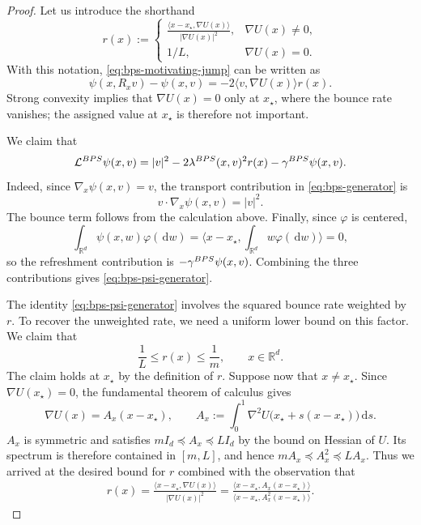 \documentclass[10pt,a4paper]{amsart}
\newcommand{\R}{\RR}
\newcommand{\RR}{\mathbb{R}}
\newcommand{\abs}[1]{\lvert#1\rvert}
\newcommand{\bps}{{\rm BPS}}
\newcommand{\dd}{\ud}
\newcommand{\ip}[2]{\langle #1,#2\rangle}
\newcommand{\ud}{\,\mathrm{d}}
\begin{document}
\begin{proof}
Let us introduce the shorthand
\[
        r(x):=
        \begin{cases}
        \displaystyle
        \frac{\ip{x-x_\star}{\nabla U(x)}}{\abs{\nabla U(x)}^2},
                &\nabla U(x)\ne0,\\[2mm]
        1/L,    &\nabla U(x)=0.
        \end{cases}
\]
With this notation, \eqref{eq:bps-motivating-jump} can be written as
\[
        \psi(x,R_xv)-\psi(x,v)
        =-2\ip{v}{\nabla U(x)}r(x).
\]
Strong convexity implies that $\nabla U(x)=0$ only at $x_\star$, where the
bounce rate vanishes; the assigned value at $x_\star$ is therefore not important.  

We claim that
\begin{equation}\label{eq:bps-psi-generator}
        \mathcal L^{\bps}\psi(x,v)
        =\abs v^2-2\lambda^{\bps}(x,v)^2r(x)
          -\gamma^{\bps}\psi(x,v).
\end{equation}
Indeed, since $\nabla_x\psi(x,v)=v$, the transport contribution in
\eqref{eq:bps-generator} is
\[
        v\cdot\nabla_x\psi(x,v)=\abs v^2.
\]
The bounce term follows from the calculation above. Finally, since $\varphi$ is centered,
\[
        \int_{\R^d}\psi(x,w)\varphi(\dd w)
        =\ip{x-x_\star}{\int_{\R^d}w\varphi(\dd w)}
        =0,
\]
so the refreshment contribution is
$-\gamma^{\bps}\psi(x,v)$.  Combining the three contributions gives
\eqref{eq:bps-psi-generator}.

The identity \eqref{eq:bps-psi-generator} involves
the squared bounce rate weighted by $r$.  To recover the unweighted rate, we
need a uniform lower bound on this factor.  We claim that
\[
        \frac1L\le r(x)\le\frac1m,
        \qquad x\in\R^d.
\]
The claim holds at $x_\star$ by the definition of $r$.  Suppose now that
$x\ne x_\star$.  Since $\nabla U(x_\star)=0$, the fundamental theorem of
calculus gives
\[
        \nabla U(x)=A_x(x-x_\star),
        \qquad
        A_x:=\int_0^1
        \nabla^2U\bigl(x_\star+s(x-x_\star)\bigr)\dd s.
\]
$A_x$ is symmetric and satisfies
$mI_d\preceq A_x\preceq L I_d$ by the bound on Hessian of $U$.  Its spectrum is therefore contained in
$[m,L]$, and hence $mA_x\preceq A_x^2\preceq LA_x$. Thus we arrived at the desired bound for $r$ combined with the observation that 
\[
\begin{aligned}
        r(x)
        =\frac{\ip{x-x_\star}{\nabla U(x)}}
                {\abs{\nabla U(x)}^2}
        =\frac{\ip{x-x_\star}{A_x(x-x_\star)}}
                {\ip{x-x_\star}{A_x^2(x-x_\star)}}.
\end{aligned}
\]


\end{proof}
\end{document}
